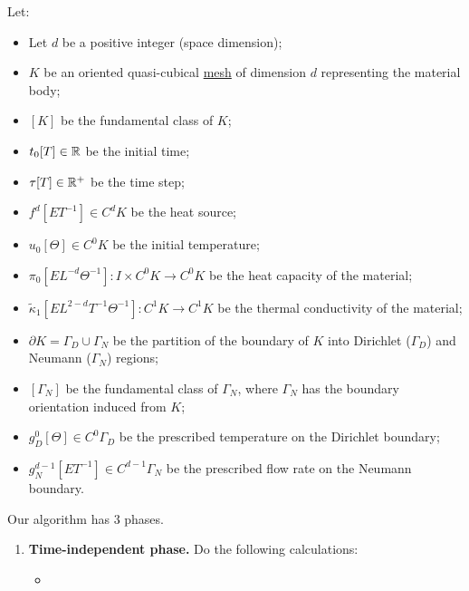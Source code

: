 \begin{algorithm}
  \label{cmc/diffusion/discrete/transient/primal_weak_solve_trapezoidal-algorithm}
  Let:
  \begin{itemize}
    \item
      Let $d$ be a positive integer (space dimension);
    \item
      $K$ be an oriented quasi-cubical \hyperref[cmc:mesh:definition]{mesh} of
      dimension $d$ representing the material body;
    \item
      $[K]$ be the fundamental class of $K$;
    \item
      $t_0 [T] \in \mathbb{R}$ be the initial time;
    \item
      $\tau [T] \in \mathbb{R}^+$ be the time step;
    \item
      $f^d [E T^{-1}] \in C^d K$ be the heat source;
    \item
      $u_0 [\Theta] \in C^0 K$ be the initial temperature;
    \item
      $\pi_0 [E L^{-d} \Theta^{-1}] \colon I \times C^0 K \to C^0 K$
      be the heat capacity of the material;
    \item
      $\tilde{\kappa}_1 [E L^{2 - d} T^{-1} \Theta^{-1}] \colon C^1 K \to C^1 K$
      be the thermal conductivity of the material;
    \item
      $\partial K = \Gamma_D \cup \Gamma_N$ be the partition of the boundary of
      $K$ into Dirichlet ($\Gamma_D$) and Neumann ($\Gamma_N$) regions;
    \item
      $[\Gamma_N]$ be the fundamental class of $\Gamma_N$, where $\Gamma_N$
      has the boundary orientation induced from $K$;
    \item
      $g_D^0 [\Theta] \in C^0 \Gamma_D$
      be the prescribed temperature on the Dirichlet boundary;
    \item
      $g_N^{d - 1} [E T^{-1}] \in C^{d - 1} \Gamma_N$
      be the prescribed flow rate on the Neumann boundary.
  \end{itemize}
  Our algorithm has $3$ phases.
  \begin{enumerate}
    \item
      \textbf{Time-independent phase.}
      Do the following calculations:
      \begin{itemize}
        \item

\end{itemize}
\end{enumerate}
\end{algorithm}
